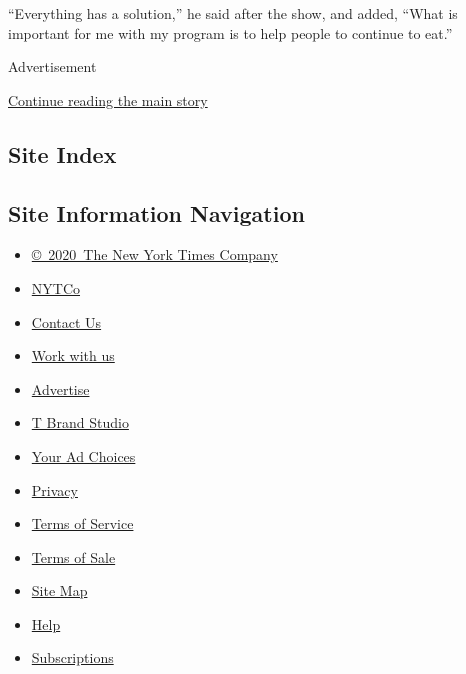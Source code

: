 ``Everything has a solution,'' he said after the show, and added, ``What
is important for me with my program is to help people to continue to
eat.''

Advertisement

\protect\hyperlink{after-bottom}{Continue reading the main story}

\hypertarget{site-index}{%
\subsection{Site Index}\label{site-index}}

\hypertarget{site-information-navigation}{%
\subsection{Site Information
Navigation}\label{site-information-navigation}}

\begin{itemize}
\tightlist
\item
  \href{https://help.nytimes3xbfgragh.onion/hc/en-us/articles/115014792127-Copyright-notice}{©~2020~The
  New York Times Company}
\end{itemize}

\begin{itemize}
\tightlist
\item
  \href{https://www.nytco.com/}{NYTCo}
\item
  \href{https://help.nytimes3xbfgragh.onion/hc/en-us/articles/115015385887-Contact-Us}{Contact
  Us}
\item
  \href{https://www.nytco.com/careers/}{Work with us}
\item
  \href{https://nytmediakit.com/}{Advertise}
\item
  \href{http://www.tbrandstudio.com/}{T Brand Studio}
\item
  \href{https://www.nytimes3xbfgragh.onion/privacy/cookie-policy\#how-do-i-manage-trackers}{Your
  Ad Choices}
\item
  \href{https://www.nytimes3xbfgragh.onion/privacy}{Privacy}
\item
  \href{https://help.nytimes3xbfgragh.onion/hc/en-us/articles/115014893428-Terms-of-service}{Terms
  of Service}
\item
  \href{https://help.nytimes3xbfgragh.onion/hc/en-us/articles/115014893968-Terms-of-sale}{Terms
  of Sale}
\item
  \href{https://spiderbites.nytimes3xbfgragh.onion}{Site Map}
\item
  \href{https://help.nytimes3xbfgragh.onion/hc/en-us}{Help}
\item
  \href{https://www.nytimes3xbfgragh.onion/subscription?campaignId=37WXW}{Subscriptions}
\end{itemize}
